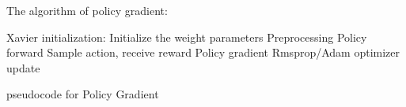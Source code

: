 The algorithm of policy gradient:

\begin{algorithm}[H]
\begin{algorithmic}[1]
\STATE Xavier initialization: Initialize the weight parameters
\STATE Preprocessing 
\STATE Policy forward
\STATE Sample action, receive reward
\STATE Policy gradient
\STATE Rmsprop/Adam optimizer update
\ENDIF
\ENDWHILE
\end{algorithmic}
\caption{pseudocode for Policy Gradient }
\label{alg:pseudocode Pong}
\end{algorithm}


